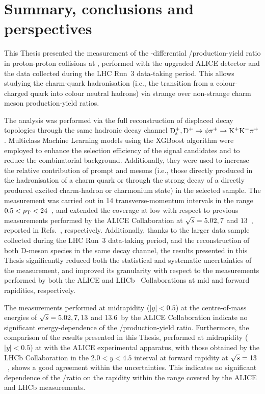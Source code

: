 \chapter{Summary, conclusions and perspectives}\label{ch:conclusions}

This Thesis presented the measurement of the \pt-differential \ds/\dpl production-yield ratio in proton-proton collisions at \thirteen, performed with the upgraded ALICE detector and the data collected during the LHC Run~3 data-taking period. This allows studying the charm-quark hadronisation (i.e., the transition from a colour-charged quark into colour neutral hadrons) via strange over non-strange charm meson production-yield ratios.

The analysis was performed via the full reconstruction of displaced decay topologies through the same hadronic decay channel $\mathrm{D_s^+}, \mathrm{D^+} \rightarrow \phi\pi^+\rightarrow\mathrm{K^+K^-\pi^+}$. Multiclass Machine Learning models using the XGBoost algorithm were employed to enhance the selection efficiency of the signal candidates and to reduce the combinatorial background. Additionally, they were used to increase the relative contribution of prompt \ds and \dpl mesons (i.e., those directly produced in the hadronisation of a charm quark or through the strong decay of a directly produced excited charm-hadron or charmonium state) in the selected sample. The measurement was carried out in 14 transverse-momentum intervals in the range $0.5<p_\mathrm{T}<24$~\gevc, and extended the \pt coverage at low \pt with respect to previous measurements performed by the ALICE Collaboration at $\sqrt{s} = 5.02, 7$ and $13$~\tev, reported in Refs.~\cite{ALICE:2021mgk,ALICE:2017olh,ALICE:2023sgl}, respectively. Additionally, thanks to the larger data sample collected during the LHC Run~3 data-taking period, and the reconstruction of both D-meson species in the same decay channel, the results presented in this Thesis significantly reduced both the statistical and systematic uncertainties of the measurement, and improved its granularity with respect to the measurements performed by both the ALICE and LHCb~\cite{LHCb:2015swx} Collaborations at mid and forward rapidities, respectively.

The measurements performed at midrapidity ($\lvert y\rvert<0.5$) at the centre-of-mass energies of  $\sqrt{s} = 5.02, 7, 13$ and 13.6~\tev by the ALICE Collaboration indicate no significant energy-dependence of the \ds/\dpl production-yield ratio. Furthermore, the comparison of the results presented in this Thesis, performed at midrapidity ($\lvert y\rvert<0.5$) at \thirteen with the ALICE experimental apparatus, with those obtained by the LHCb Collaboration in the $2.0<y<4.5$ interval at forward rapidity at $\sqrt{s}=13$~\tev, shows a good agreement within the uncertainties. This indicates no significant dependence of the \ds/\dpl ratio on the rapidity within the range covered by the ALICE and LHCb measurements. 

